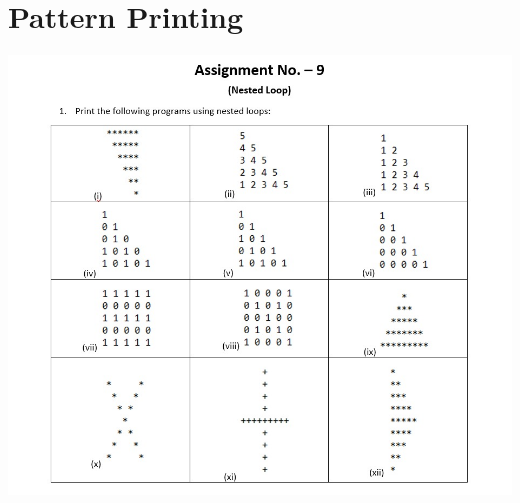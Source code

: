 \documentclass{report}
\begin{document}
\chapter{Pattern Printing}
\includegraphics[width=\textwidth]{09}
\clearpage
\section{}
\inputminted{c}{assignment_09/01.c}
\section{}
\inputminted{c}{assignment_09/02.c}
\section{}
\inputminted{c}{assignment_09/03.c}
\section{}
\inputminted{c}{assignment_09/04.c}
\section{}
\inputminted{c}{assignment_09/05.c}
\section{}
\inputminted{c}{assignment_09/06.c}
\section{}
\inputminted{c}{assignment_09/07.c}
\end{document}

